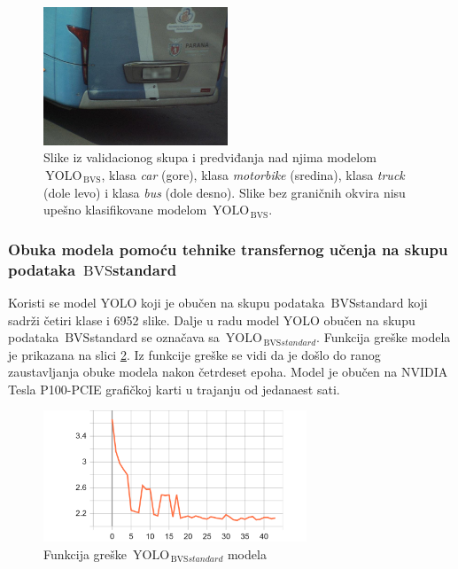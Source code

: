 \documentclass[12pt,oneside]{memoir}
\newcommand{\yolo}{\ensuremath{\,\textrm{YOLO}}}
\newcommand{\bvs}{\ensuremath{\,\textrm{BVS}}}
\begin{document}
\begin{figure}[!htbp]
  \includegraphics[width=0.49\textwidth]{matfmaster/yolo/v4/without_augmentation/bus_0f.jpg}
\caption{Slike iz validacionog skupa i predviđanja nad njima modelom $\yolo_{\bvs{}}$, klasa \textit{car} (gore), klasa \textit{motorbike} (sredina), klasa \textit{truck} (dole levo) i klasa \textit{bus} (dole desno). Slike bez graničnih okvira nisu upešno klasifikovane modelom $\yolo_{\bvs{}}$.}
\label{fig:section4_yolo4noaug_images}
\end{figure}



\subsubsection{Obuka modela pomoću tehnike transfernog učenja na skupu podataka \bvs{standard}}

Koristi se model YOLO koji je obučen na skupu podataka \bvs{standard} koji sadrži četiri klase i 6952 slike. Dalje u radu model YOLO obučen na skupu podataka \bvs{standard} se označava sa $\yolo_{\bvs{standard}}$. Funkcija greške modela je prikazana na slici \ref{fig:section4_yolov4baseaug_loss}. Iz funkcije greške se vidi da je došlo do ranog zaustavljanja obuke modela nakon četrdeset epoha. Model je obučen na NVIDIA Tesla P100-PCIE grafičkoj karti u trajanju od jedanaest sati.

\begin{figure}[!htbp]
\centering
  \includegraphics[width=0.70\textwidth]{matfmaster/yolo/v4/basic_augmentation/epoch_loss.png}
\caption{Funkcija greške  $\yolo_{\bvs{standard}}$ modela}
\label{fig:section4_yolov4baseaug_loss}
\end{figure}
\end{document}
